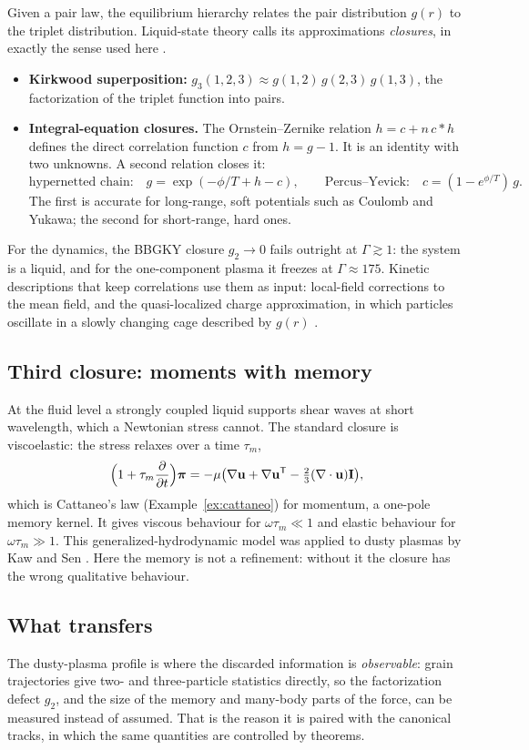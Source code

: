 Given a pair law, the equilibrium hierarchy relates the pair distribution
$g(r)$ to the triplet distribution. Liquid-state theory calls its
approximations \emph{closures}, in exactly the sense used here
\cite{HansenMcDonald}.
\begin{itemize}
  \item \textbf{Kirkwood superposition:}
    $g_3(1,2,3)\approx g(1,2)\,g(2,3)\,g(1,3)$, the factorization of the
    triplet function into pairs.
  \item \textbf{Integral-equation closures.} The Ornstein--Zernike relation
    $h=c+n\,c*h$ defines the direct correlation function $c$ from
    $h=g-1$. It is an identity with two unknowns. A second relation closes
    it:
    \[
      \text{hypernetted chain:}\quad g=\exp(-\phi/T+h-c),
      \qquad
      \text{Percus--Yevick:}\quad c=(1-e^{\phi/T})\,g .
    \]
    The first is accurate for long-range, soft potentials such as Coulomb
    and Yukawa; the second for short-range, hard ones.
\end{itemize}
For the dynamics, the BBGKY closure $g_2\to0$ fails outright at
$\Gamma\gtrsim1$: the system is a liquid, and for the one-component plasma
it freezes at $\Gamma\approx175$. Kinetic descriptions that keep
correlations use them as input: local-field corrections to the mean field,
and the quasi-localized charge approximation, in which particles oscillate
in a slowly changing cage described by $g(r)$ \cite{GoldenKalman00}.

\subsection{Third closure: moments with memory}

At the fluid level a strongly coupled liquid supports shear waves at short
wavelength, which a Newtonian stress cannot. The standard closure is
viscoelastic: the stress relaxes over a time $\tau_m$,
\begin{equation}
  \Bigl(1+\tau_m\frac{\partial}{\partial t}\Bigr)\boldsymbol\pi
  =-\mu\bigl(\nabla\mathbf{u}+\nabla\mathbf{u}^{\mathsf T}
     -\tfrac23(\nabla\cdot\mathbf{u})\mathbf I\bigr),
\end{equation}
which is Cattaneo's law (Example~\ref{ex:cattaneo}) for momentum, a
one-pole memory kernel. It gives viscous behaviour for
$\omega\tau_m\ll1$ and elastic behaviour for $\omega\tau_m\gg1$. This
generalized-hydrodynamic model was applied to dusty plasmas by Kaw and Sen
\cite{KawSen98}. Here the memory is not a refinement: without it the
closure has the wrong qualitative behaviour.

\subsection{What transfers}

The dusty-plasma profile is where the discarded information is
\emph{observable}: grain trajectories give two- and three-particle
statistics directly, so the factorization defect $g_2$, and the size of the
memory and many-body parts of the force, can be measured instead of
assumed. That is the reason it is paired with the canonical tracks, in
which the same quantities are controlled by theorems.
